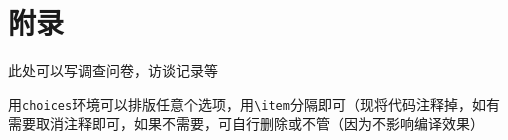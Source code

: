 \chapter*{附录}

此处可以写调查问卷，访谈记录等

用\verb|choices|环境可以排版任意个选项，用\verb|\item|分隔即可（现将代码注释掉，如有需要取消注释即可，如果不需要，可自行删除或不管（因为不影响编译效果）



